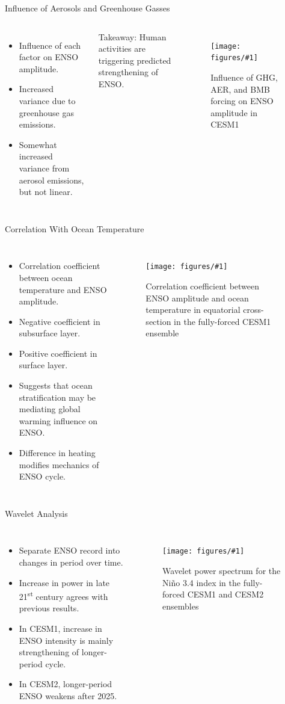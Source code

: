 \documentclass{beamer}
\newcommand{\myfig}[3]{
  \begin{figure}
    \centering
    \texttt{[image: figures/\#1]}
    \caption{#2}
    \label{fig:#3}
  \end{figure}
}
\begin{document}
\begin{frame}{Influence of Aerosols and Greenhouse Gasses}
  \begin{columns}
    \begin{itemize}
    \item Influence of each factor on ENSO amplitude.
    \item Increased variance due to greenhouse gas emissions.
    \item Somewhat increased variance from aerosol emissions, but not linear.
    \end{itemize}
    \alert{Takeaway:} Human activities are triggering predicted strengthening of ENSO.
    \myfig{cesm1_sf_4.pdf}{Influence of GHG, AER, and BMB forcing on ENSO amplitude in CESM1}{cesm1_sf_4}
  \end{columns}
\end{frame}

\begin{frame}{Correlation With Ocean Temperature}
  \begin{columns}
    \begin{itemize}
    \item Correlation coefficient between ocean temperature and ENSO amplitude.
    \item Negative coefficient in subsurface layer.
    \item Positive coefficient in surface layer.
    \item Suggests that ocean stratification may be mediating global warming influence on ENSO.
    \item Difference in heating modifies mechanics of ENSO cycle.
    \end{itemize}
    \myfig{tempdt.pdf}{Correlation coefficient between ENSO amplitude and ocean temperature in equatorial cross-section in the fully-forced CESM1 ensemble}{tempdt}
  \end{columns}
\end{frame}

\begin{frame}{Wavelet Analysis}
  \begin{columns}
    \begin{itemize}
    \item Separate ENSO record into changes in period over time.
    \item Increase in power in late 21\textsuperscript{st} century agrees with previous results.
    \item In CESM1, increase in ENSO intensity is mainly strengthening of longer-period cycle.
    \item In CESM2, longer-period ENSO weakens after 2025.
    \end{itemize}
    \myfig{wavelet3.pdf}{Wavelet power spectrum for the Niño 3.4 index in the fully-forced CESM1 and CESM2 ensembles}{wavelet2}
  \end{columns}
\end{frame}
\end{document}

